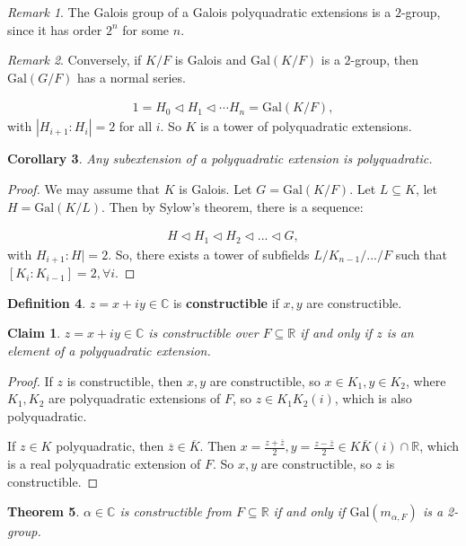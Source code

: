 \documentclass[9pt,reqno,twoside]{amsbook}
\theoremstyle{plain}
\newtheorem*{Claim}{Claim}
\newtheorem{theorem}{Theorem}[chapter]
\numberwithin{section}{chapter}
\numberwithin{equation}{chapter}
\newtheorem{Cor}[theorem]{Corollary}
\theoremstyle{definition}
\newtheorem{Def}[theorem]{Definition}
\theoremstyle{remark}
\newtheorem{rem}[theorem]{Remark}
\theoremstyle{plain}
\newcommand{\propnorm}{\triangleleft}
\newcommand{\sub}{\subseteq}
\newcommand{\R}{\mathbb{R}}
\renewcommand{\c}{\mathbb{C}}
\newcommand{\bee}{\begin{equation}\begin{aligned}}
\newcommand{\eee}{\end{aligned}\end{equation}}
\newcommand{\fracc}{\frac}
\newcommand{\gal}{\mathrm{Gal}}
\renewcommand{\bar}{\overline}%
\begin{document}
\begin{rem}
The Galois group of a Galois polyquadratic extensions is a $2$-group, since it has order $2^n$ for some $n$. 
\end{rem}

\begin{rem}
Conversely, if $K/F$ is Galois and $\gal(K/F)$ is a $2$-group, then $\gal(G/F)$ has a normal series. 
\end{rem}

\bee
1 = H_0 \propnorm H_1 \propnorm \cdots H_n = \gal(K/F),
\eee
with $|H_{i + 1}:H_i| = 2$ for all $i$. So $K$ is a tower of polyquadratic extensions. 


\begin{Cor}
Any subextension of a polyquadratic extension is polyquadratic. 
\end{Cor}

\begin{proof}
We may assume that $K$ is Galois. Let $G = \gal(K/F)$. Let $L \sub K$, let $H = \gal(K/L)$. Then by Sylow's theorem, there is a sequence:

\bee
H \propnorm H_1 \propnorm H_2 \propnorm ... \propnorm G,
\eee
with $H_{i + 1}:H| = 2$. So, there exists a tower of subfields $L/K_{n - 1}/.../F$ such that $[K_i:K_{i - 1}] = 2, \forall i$. 
\end{proof}

\begin{Def}
$z = x + iy \in \c$ is \textbf{constructible} if $x,y$ are constructible. 
\end{Def}

\begin{Claim}
$z = x + iy \in \c$ is constructible over $F \sub \R$ if and only if $z$ is an element of a polyquadratic extension. 
\end{Claim}
\begin{proof}
If $z$ is constructible, then $x,y$ are constructible, so $x \in K_1, y \in K_2$, where $K_1,K_2$ are polyquadratic extensions of $F$, so $z \in K_1K_2(i)$, which is also polyquadratic. 

If $z \in K$ polyquadratic, then $\bar{z} \in \bar{K}$. Then $x = \fracc{z + \bar{z}}{2}, y = \fracc{z - \bar{z}}{2}\in K\bar{K}(i)\cap \R$, which is a real polyquadratic extension of $F$. So $x,y$ are constructible, so $z$ is constructible. 
\end{proof}

\begin{theorem}
$\alpha \in \c$ is constructible from $F \sub \R$ if and only if $\gal(m_{\alpha,F})$ is a 2-group. 
\end{theorem}
\end{document}
